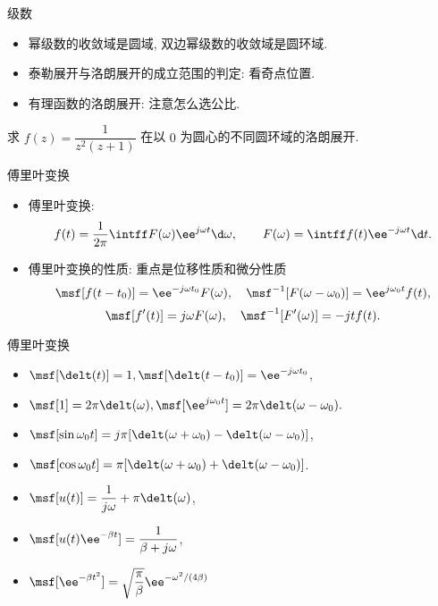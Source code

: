 \documentclass[aspectratio=169,handout]{ctexbeamer}
\begin{document}
\begin{frame}{级数}
	\begin{itemize}
		\item 幂级数的收敛域是圆域, 双边幂级数的收敛域是圆环域.
		\item 泰勒展开与洛朗展开的成立范围的判定: 看奇点位置.
		\item 有理函数的洛朗展开: 注意怎么选公比.
	\end{itemize}
	\onslide<+->
	\begin{exercise}
		求 $f(z)=\dfrac{1}{z^2(z+1)}$ 在以 $0$ 为圆心的不同圆环域的洛朗展开.
	\end{exercise}
\end{frame}


\begin{frame}{傅里叶变换}
	\begin{itemize}
		\item 傅里叶变换:
	\[
			f(t)=\frac1{2\pi} \intff F(\omega) \ee^{j\omega t} \d\omega,\qquad
			F(\omega)=\intff f(t) \ee^{-j\omega t} \d t.
	\]
		\item 傅里叶变换的性质: 重点是位移性质和微分性质
	\[
			\msf[f(t-t_0)]=\ee^{-j\omega t_0}F(\omega),\quad
			\msf^{-1}[F(\omega-\omega_0)]=\ee^{j\omega_0 t}f(t),
	\]
	\[
			\msf[f'(t)]=j\omega F(\omega),\quad
			\msf^{-1}[F'(\omega)]=-jtf(t).
	\]
	\end{itemize}
\end{frame}


\begin{frame}{傅里叶变换}
	\begin{itemize}
		\item $\msf[\delt(t)]=1,\msf[\delt(t-t_0)]=\ee^{-j\omega t_0}$,
		\item $\msf[1]=2\pi \delt(\omega),\msf[\ee^{j\omega_0 t}]=2\pi\delt(\omega-\omega_0).$
		\item $\msf[\sin{\omega_0 t}]=j\pi[\delt(\omega+\omega_0)-\delt(\omega-\omega_0)]$,
		\item $\msf[\cos{\omega_0 t}]=\pi[\delt(\omega+\omega_0)+\delt(\omega-\omega_0)]$.
		\item $\msf[u(t)]=\dfrac1{j\omega}+\pi\delt(\omega)$,
		\item $\msf[u(t)\ee^{-\beta t}]=\dfrac1{\beta+j\omega}$,
		\item $\msf[\ee^{-\beta t^2}]=\sqrt{\dfrac\pi\beta}\ee^{-\omega^2/(4\beta)}$
	\end{itemize}
\end{frame}
\end{document}
